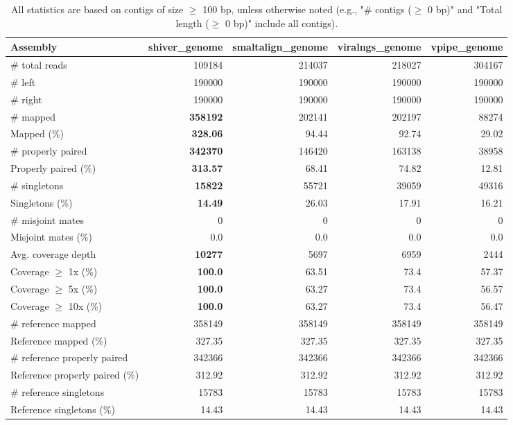 \documentclass[12pt,a4paper]{article}
\begin{document}
\begin{table}[ht]
\begin{center}
\caption{All statistics are based on contigs of size $\geq$ 100 bp, unless otherwise noted (e.g., "\# contigs ($\geq$ 0 bp)" and "Total length ($\geq$ 0 bp)" include all contigs).}
\begin{tabular}{|l*{4}{|r}|}
\hline
Assembly & shiver\_genome & smaltalign\_genome & viralngs\_genome & vpipe\_genome \\ \hline
\# total reads & 109184 & 214037 & 218027 & 304167 \\ \hline
\# left & 190000 & 190000 & 190000 & 190000 \\ \hline
\# right & 190000 & 190000 & 190000 & 190000 \\ \hline
\# mapped & {\bf 358192} & 202141 & 202197 & 88274 \\ \hline
Mapped (\%) & {\bf 328.06} & 94.44 & 92.74 & 29.02 \\ \hline
\# properly paired & {\bf 342370} & 146420 & 163138 & 38958 \\ \hline
Properly paired (\%) & {\bf 313.57} & 68.41 & 74.82 & 12.81 \\ \hline
\# singletons & {\bf 15822} & 55721 & 39059 & 49316 \\ \hline
Singletons (\%) & {\bf 14.49} & 26.03 & 17.91 & 16.21 \\ \hline
\# misjoint mates & 0 & 0 & 0 & 0 \\ \hline
Misjoint mates (\%) & 0.0 & 0.0 & 0.0 & 0.0 \\ \hline
Avg. coverage depth & {\bf 10277} & 5697 & 6959 & 2444 \\ \hline
Coverage $\geq$ 1x (\%) & {\bf 100.0} & 63.51 & 73.4 & 57.37 \\ \hline
Coverage $\geq$ 5x (\%) & {\bf 100.0} & 63.27 & 73.4 & 56.57 \\ \hline
Coverage $\geq$ 10x (\%) & {\bf 100.0} & 63.27 & 73.4 & 56.47 \\ \hline
\# reference mapped & 358149 & 358149 & 358149 & 358149 \\ \hline
Reference mapped (\%) & 327.35 & 327.35 & 327.35 & 327.35 \\ \hline
\# reference properly paired & 342366 & 342366 & 342366 & 342366 \\ \hline
Reference properly paired (\%) & 312.92 & 312.92 & 312.92 & 312.92 \\ \hline
\# reference singletons & 15783 & 15783 & 15783 & 15783 \\ \hline
Reference singletons (\%) & 14.43 & 14.43 & 14.43 & 14.43 \\ \hline

\end{tabular}
\end{center}
\end{table}
\end{document}
